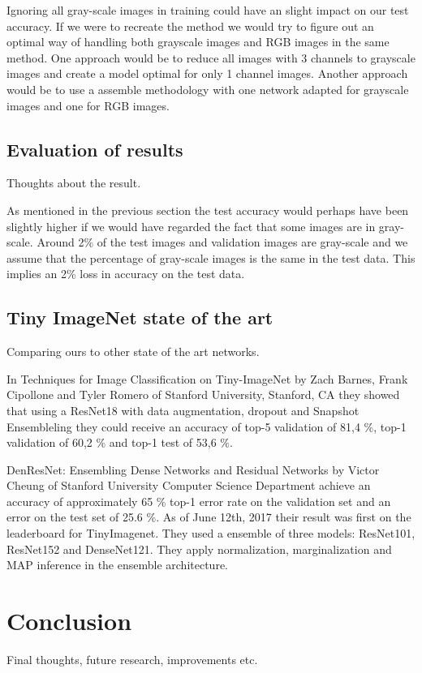 \documentclass{kthreport}
\begin{document}
Ignoring all gray-scale images in training could have an slight impact on our test accuracy. If we were to recreate the method we would try to figure out an optimal way of handling both grayscale images and RGB images in the same method. One approach would be to reduce all images with 3 channels to grayscale images and create a model optimal for only 1 channel images. Another approach would be to use a assemble methodology with one network adapted for grayscale images and one for RGB images.

\subsection{Evaluation of results}

Thoughts about the result.

As mentioned in the previous section the test accuracy would perhaps have been slightly higher if we would have regarded the fact that some images are in gray-scale. Around 2\% of the test images and validation images are gray-scale and we assume that the percentage of gray-scale images is the same in the test data. This implies an 2\% loss in accuracy on the test data.

\subsection{Tiny ImageNet state of the art}

Comparing ours to other state of the art networks.

In Techniques for Image Classification on Tiny-ImageNet by Zach Barnes, Frank Cipollone and Tyler Romero of Stanford University, Stanford, CA they showed that using a ResNet18 with data augmentation, dropout and Snapshot Ensembleling they could receive an accuracy of top-5 validation of 81,4 \%, top-1 validation of 60,2 \% and top-1 test of 53,6 \%.


DenResNet: Ensembling Dense Networks and Residual Networks by Victor Cheung of Stanford University Computer Science Department achieve an accuracy of approximately 65 \% top-1 error rate on the validation set and an error on the test set of 25.6 \%. As of June 12th, 2017 their result was first on the leaderboard for TinyImagenet. They used a  ensemble of three models: ResNet101, ResNet152 and DenseNet121. They apply normalization, marginalization and MAP inference in the ensemble architecture.

\section{Conclusion}
Final thoughts, future research, improvements etc.



{}

\end{document}
